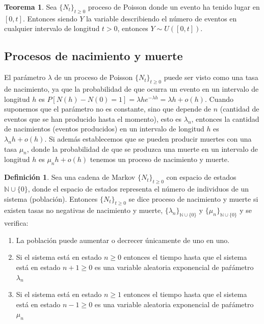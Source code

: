 \documentclass[a4paper,10pt]{scrartcl}
\theoremstyle{definition}
\newtheorem*{mydef}{Definición}
\newtheorem*{theorem}{Teorema}
\numberwithin{equation}{section}
\begin{document}

\begin{theorem}
 Sea $\{N_t\}_{t\ge 0}$ proceso de Poisson donde un evento ha tenido lugar en $[0,t]$. Entonces siendo $Y$ la variable
 describiendo el número de eventos en cualquier intervalo de longitud $t > 0$, entonces $Y \sim U([0,t])$.
\end{theorem}


\subsection{Procesos de nacimiento y muerte}

El parámetro $\lambda$ de un proceso de Poisson $\{N_t\}_{t\ge 0}$ puede ser visto como una tasa de nacimiento, ya que la probabilidad
de que ocurra un evento en un intervalo de longitud $h$ es $P[N(h)-N(0)=1] = \lambda h e^{-\lambda h} = \lambda h + o(h)$.
Cuando suponemos que el parámetro no es constante, sino que depende de $n$ (cantidad de eventos que se han producido hasta el momento), esto
es $\lambda_n$, entonces la cantidad de nacimientos (eventos producidos) en un intervalo de longitud $h$ es $\lambda_n h + o(h)$. Si además
establecemos que se pueden producir muertes con una tasa $\mu_n$, donde la probabilidad de que se produzca una muerte en un intervalo de longitud
$h$ es $\mu_n h + o(h)$ tenemos un proceso de nacimiento y muerte.

\begin{mydef}
 Sea una cadena de Markov $\{N_t\}_{t\ge 0}$ con espacio de estados $\mathbb{N}\cup \{0\}$, donde el espacio de estados representa el número de individuos
 de un sistema (población). Entonces $\{N_t\}_{t\ge 0}$ se dice proceso de nacimiento y muerte si existen tasas no negativas de nacimiento y muerte,
 $\{\lambda_n\}_{\mathbb{N}\cup \{0\}}$ y $\{\mu_n\}_{\mathbb{N}\cup \{0\}}$ y se verifica:
 
 \begin{enumerate}
  \item La población puede aumentar o decrecer únicamente de uno en uno.
  \item Si el sistema está en estado $n\ge 0$ entonces el tiempo hasta que el sistema está en estado $n+1 \ge 0$ es una variable aleatoria exponencial
  de paŕámetro $\lambda_n$
  \item Si el sistema está en estado $n\ge 1$ entonces el tiempo hasta que el sistema está en estado $n-1 \ge 0$ es una variable aleatoria exponencial
  de paŕámetro $\mu_n$
 \end{enumerate}
\end{mydef}
\end{document}
